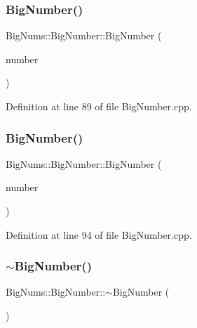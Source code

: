 \subsubsection{\texorpdfstring{BigNumber()}{BigNumber()}\hspace{0.1cm}{\footnotesize\ttfamily [15/16]}}
{\footnotesize\ttfamily Big\+Nums\+::\+Big\+Number\+::\+Big\+Number (\begin{DoxyParamCaption}\item[{const std\+::vector$<$ char $>$ \&}]{number }\end{DoxyParamCaption})\hspace{0.3cm}{\ttfamily [explicit]}}



Definition at line 89 of file Big\+Number.\+cpp.

\mbox{\label{class_big_nums_1_1_big_number_a3a065889297357cb69da1f503f017a27}} 
\subsubsection{\texorpdfstring{BigNumber()}{BigNumber()}\hspace{0.1cm}{\footnotesize\ttfamily [16/16]}}
{\footnotesize\ttfamily Big\+Nums\+::\+Big\+Number\+::\+Big\+Number (\begin{DoxyParamCaption}\item[{const \mbox{\hyperlink{class_big_nums_1_1_big_number}{Big\+Number}} \&}]{number }\end{DoxyParamCaption})}



Definition at line 94 of file Big\+Number.\+cpp.

\mbox{\label{class_big_nums_1_1_big_number_a09e060fefa8279c48d5a5f12fde8c802}} 
\subsubsection{\texorpdfstring{$\sim$BigNumber()}{~BigNumber()}}
{\footnotesize\ttfamily Big\+Nums\+::\+Big\+Number\+::$\sim$\+Big\+Number (\begin{DoxyParamCaption}{ }\end{DoxyParamCaption})\hspace{0.3cm}{\ttfamily [default]}}



